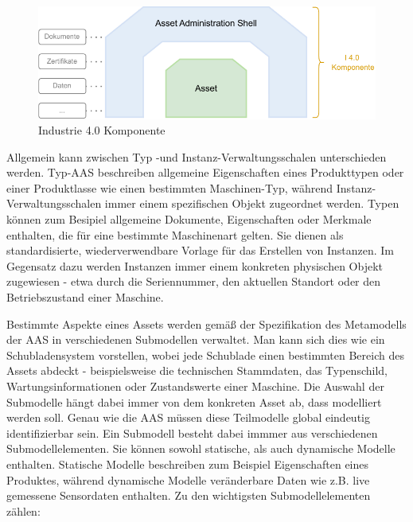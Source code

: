 \vspace{2em}
\begin{figure}[htbp]
    \centering
    \includegraphics[width=1\textwidth]{Bilder/i4_komponente_neu.pdf}
    \caption{Industrie 4.0 Komponente}
    \label{fig:klassifizierungDT}
\end{figure}
Allgemein kann zwischen Typ -und Instanz-Verwaltungsschalen unterschieden werden.
Typ-AAS beschreiben allgemeine Eigenschaften eines Produkttypen oder einer Produktlasse wie einen bestimmten Maschinen-Typ, während Instanz-Verwaltungsschalen immer einem spezifischen Objekt zugeordnet werden.
Typen können zum Besipiel allgemeine Dokumente, Eigenschaften oder Merkmale enthalten, die für eine bestimmte Maschinenart gelten.
Sie dienen als standardisierte, wiederverwendbare Vorlage für das Erstellen von Instanzen.
Im Gegensatz dazu werden Instanzen immer einem konkreten physischen Objekt zugewiesen - etwa durch die Seriennummer, den aktuellen Standort oder den Betriebszustand einer Maschine.

Bestimmte Aspekte eines Assets werden gemäß der Spezifikation des Metamodells der AAS \cite{SpezifikationPart1} in verschiedenen Submodellen verwaltet.
Man kann sich dies wie ein Schubladensystem vorstellen, wobei jede Schublade einen bestimmten Bereich des Assets abdeckt - beispielsweise die technischen Stammdaten, das Typenschild, Wartungsinformationen oder Zustandswerte einer Maschine.
Die Auswahl der Submodelle hängt dabei immer von dem konkreten Asset ab, dass modelliert werden soll.
Genau wie die AAS müssen diese Teilmodelle global eindeutig identifizierbar sein.
Ein Submodell besteht dabei immmer aus verschiedenen Submodellelementen. Sie können sowohl statische, als auch dynamische Modelle enthalten.
Statische Modelle beschreiben zum Beispiel Eigenschaften eines Produktes, während dynamische Modelle veränderbare Daten wie z.B. live gemessene Sensordaten enthalten. 
Zu den wichtigsten Submodellelementen zählen:

